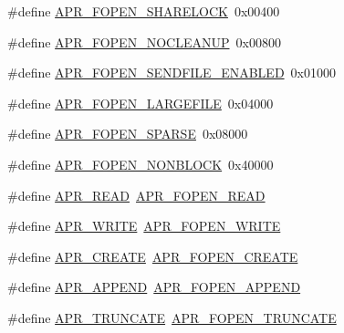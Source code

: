 \begin{DoxyCompactItemize}
\#define \hyperlink{group__apr__file__open__flags_ga426f6e2a8457ab410d99248269059a18}{A\-P\-R\-\_\-\-F\-O\-P\-E\-N\-\_\-\-S\-H\-A\-R\-E\-L\-O\-C\-K}~0x00400
\item 
\#define \hyperlink{group__apr__file__open__flags_ga3fc9b5a7791d9f462997cd29de67eb80}{A\-P\-R\-\_\-\-F\-O\-P\-E\-N\-\_\-\-N\-O\-C\-L\-E\-A\-N\-U\-P}~0x00800
\item 
\#define \hyperlink{group__apr__file__open__flags_ga60c21e28e4a612d58a874fe2cc71a6e4}{A\-P\-R\-\_\-\-F\-O\-P\-E\-N\-\_\-\-S\-E\-N\-D\-F\-I\-L\-E\-\_\-\-E\-N\-A\-B\-L\-E\-D}~0x01000
\item 
\#define \hyperlink{group__apr__file__open__flags_gaf6cfaa4789e6264afd186235f0adbc22}{A\-P\-R\-\_\-\-F\-O\-P\-E\-N\-\_\-\-L\-A\-R\-G\-E\-F\-I\-L\-E}~0x04000
\item 
\#define \hyperlink{group__apr__file__open__flags_ga0d155e9bb7fbf1a5cd4e84b5ede059f4}{A\-P\-R\-\_\-\-F\-O\-P\-E\-N\-\_\-\-S\-P\-A\-R\-S\-E}~0x08000
\item 
\#define \hyperlink{group__apr__file__open__flags_ga31e4d14068147e43e1778bcf975dda62}{A\-P\-R\-\_\-\-F\-O\-P\-E\-N\-\_\-\-N\-O\-N\-B\-L\-O\-C\-K}~0x40000
\item 
\#define \hyperlink{group__apr__file__open__flags_ga0021db78d799d1c8825b701c7efee483}{A\-P\-R\-\_\-\-R\-E\-A\-D}~\hyperlink{group__apr__file__open__flags_gaf9e7303f028b130ff7d4b209d6662d7d}{A\-P\-R\-\_\-\-F\-O\-P\-E\-N\-\_\-\-R\-E\-A\-D}
\item 
\#define \hyperlink{group__apr__file__open__flags_ga3e427e53aceb1ccdb078d9a03cd63d01}{A\-P\-R\-\_\-\-W\-R\-I\-T\-E}~\hyperlink{group__apr__file__open__flags_gac598bb95fc9476b0bf2ed0b1c308842c}{A\-P\-R\-\_\-\-F\-O\-P\-E\-N\-\_\-\-W\-R\-I\-T\-E}
\item 
\#define \hyperlink{group__apr__file__open__flags_gac210e96bc821dbaa83c326e775dad028}{A\-P\-R\-\_\-\-C\-R\-E\-A\-T\-E}~\hyperlink{group__apr__file__open__flags_gafe94f21ccbf411172e70e7f473af251a}{A\-P\-R\-\_\-\-F\-O\-P\-E\-N\-\_\-\-C\-R\-E\-A\-T\-E}
\item 
\#define \hyperlink{group__apr__file__open__flags_ga26d3de2bae5c90e5124869f56c141c2e}{A\-P\-R\-\_\-\-A\-P\-P\-E\-N\-D}~\hyperlink{group__apr__file__open__flags_ga45f353db9b71d4760a3f35cf3781cfc8}{A\-P\-R\-\_\-\-F\-O\-P\-E\-N\-\_\-\-A\-P\-P\-E\-N\-D}
\item 
\#define \hyperlink{group__apr__file__open__flags_gaa8898fdebd69d3a64286731b713a6dc9}{A\-P\-R\-\_\-\-T\-R\-U\-N\-C\-A\-T\-E}~\hyperlink{group__apr__file__open__flags_ga09b05a5bd5db534b93794f7657bcb146}{A\-P\-R\-\_\-\-F\-O\-P\-E\-N\-\_\-\-T\-R\-U\-N\-C\-A\-T\-E}

\end{DoxyCompactItemize}
